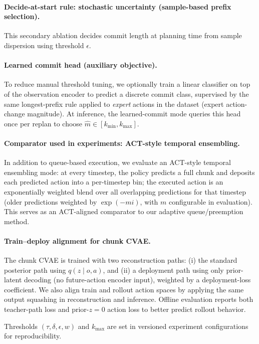 \documentclass{article}
\begin{document}
\paragraph{Decide-at-start rule: stochastic uncertainty (sample-based prefix selection).}
This secondary ablation decides commit length at planning time from sample dispersion using threshold $\epsilon$.

\paragraph{Learned commit head (auxiliary objective).}
To reduce manual threshold tuning, we optionally train a linear classifier on top of the observation encoder to predict a discrete commit class, supervised by the same longest-prefix rule applied to \emph{expert} actions in the dataset (expert action-change magnitude). At inference, the learned-commit mode queries this head once per replan to choose $\hat{m}\in[k_{\min},k_{\max}]$.

\paragraph{Comparator used in experiments: ACT-style temporal ensembling.}
In addition to queue-based execution, we evaluate an ACT-style temporal ensembling mode: at every timestep, the policy predicts a full chunk and deposits each predicted action into a per-timestep bin; the executed action is an exponentially weighted blend over all overlapping predictions for that timestep (older predictions weighted by $\exp(-m i)$, with $m$ configurable in evaluation). This serves as an ACT-aligned comparator to our adaptive queue/preemption method.

\paragraph{Train--deploy alignment for chunk CVAE.}
The chunk CVAE is trained with two reconstruction paths: (i) the standard posterior path using $q(z \mid o, a)$, and (ii) a deployment path using only prior-latent decoding (no future-action encoder input), weighted by a deployment-loss coefficient. We also align train and rollout action spaces by applying the same output squashing in reconstruction and inference. Offline evaluation reports both teacher-path loss and prior-$z{=}0$ action loss to better predict rollout behavior.

Thresholds $(\tau,\delta,\epsilon,w)$ and $k_{\max}$ are set in versioned experiment configurations for reproducibility.
\end{document}
